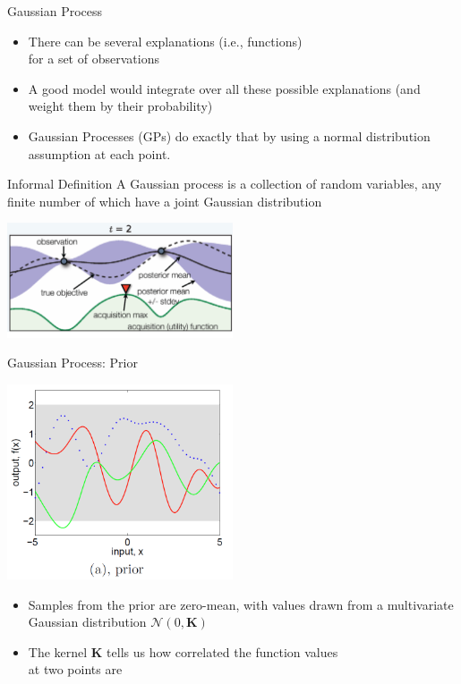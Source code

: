 \begin{frame}[c]{Gaussian Process}

\begin{itemize}
	\item There can be several explanations (i.e., functions)\\ for a set of observations
	\pause
	\item A good model would integrate over all these possible explanations (and weight them by their probability)
	\pause
	\item Gaussian Processes (GPs) do exactly that by using a normal distribution assumption at each point.
\end{itemize}

\begin{block}{Informal Definition}
A Gaussian process is a collection of random variables, any finite number of which have a joint Gaussian distribution
\end{block}

\pause

\centering
\includegraphics[width=0.5\textwidth]{images/bo_pic1.png}

\end{frame}
\begin{frame}[c]{Gaussian Process: Prior}

\centering
\includegraphics[width=0.5\textwidth]{images/gp_prior.png}

\begin{itemize}
	\item Samples from the prior are zero-mean, with values drawn from a multivariate Gaussian distribution $\mathcal{N}(0,\mathbf{K})$
	\item The kernel $\mathbf{K}$ tells 
	us how correlated the function values\\ at two points are
\end{itemize}

\end{frame}
